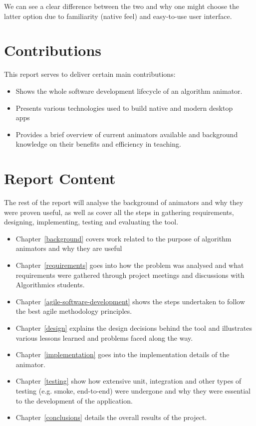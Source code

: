 \documentclass{l4proj}
\begin{document}
We can see a clear difference between the two and why one might choose the latter option due to familiarity (native feel) and easy-to-use user interface.

\section{Contributions}

This report serves to deliver certain main contributions:

\begin{itemize}
	\item Shows the whole software development lifecycle of an algorithm animator.
	\item Presents various technologies used to build native and modern desktop apps~\cite{electron}~\cite{visjs}
	\item Provides a brief overview of current animators available and background knowledge on their benefits and efficiency in teaching.
\end{itemize}


\section{Report Content}
The rest of the report will analyse the background of animators and why they were proven useful, as well as cover all the steps in gathering requirements, designing, implementing, testing and evaluating the tool.

\begin{itemize}
\item Chapter~\ref{background} covers work related to the purpose of algorithm animators and why they are useful
\item Chapter~\ref{requirements} goes into how the problem was analysed and what requirements were gathered through
	project meetings and discussions with Algorithmics students.
\item Chapter~\ref{agile-software-development} shows the steps undertaken to follow the best agile methodology principles.
\item Chapter~\ref{design} explains the design decisions behind the tool and illustrates various lessons learned and
	problems faced along the way.
\item Chapter~\ref{implementation} goes into the implementation details of the animator.
\item Chapter~\ref{testing} show how extensive unit, integration and other types of testing (e.g. smoke, end-to-end)
	were undergone and why they were essential to the development of the application.
\item Chapter~\ref{conclusions} details the overall results of the project.
\end{itemize}
\end{document}
